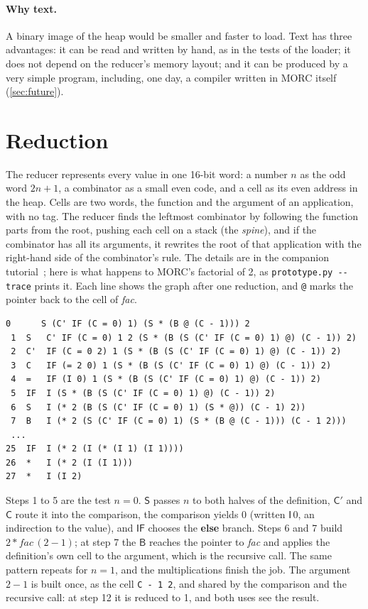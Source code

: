 \documentclass[11pt,a4paper]{article}
\newcommand{\cmb}[1]{\textsf{#1}}
\newcommand{\I}{\cmb{I}}
\newcommand{\Sc}{\cmb{S}}
\newcommand{\B}{\cmb{B}}
\newcommand{\C}{\cmb{C}}
\newcommand{\Cp}{\cmb{C}'}
\newcommand{\IF}{\cmb{IF}}
\theoremstyle{definition}
\theoremstyle{plain}
\newcommand{\kw}[1]{\textbf{#1}}
\begin{document}
\paragraph{Why text.} A binary image of the heap would be smaller and faster
to load. Text has three advantages: it can be read and written by hand, as
in the tests of the loader; it does not depend on the reducer's memory
layout; and it can be produced by a very simple program, including, one day,
a compiler written in MORC itself (\cref{sec:future}).

\section{Reduction}\label{sec:reduction}

The reducer represents every value in one 16-bit word: a number $n$ as the
odd word $2n+1$, a combinator as a small even code, and a cell as its even
address in the heap. Cells are two words, the function and the argument of an
application, with no tag. The reducer finds the leftmost combinator by
following the function parts from the root, pushing each cell on a stack (the
\emph{spine}), and if the combinator has all its arguments, it rewrites the
root of that application with the right-hand side of the combinator's rule.
The details are in the companion tutorial~\cite{graphtut}; here is what
happens to MORC's factorial of 2, as \texttt{prototype.py -{}-trace} prints
it. Each line shows the graph after one reduction, and \verb|@| marks the
pointer back to the cell of \textit{fac}.

\begin{lstlisting}[style=plain, basicstyle=\ttfamily\footnotesize]
 0      S (C' IF (C = 0) 1) (S * (B @ (C - 1))) 2
 1  S   C' IF (C = 0) 1 2 (S * (B (S (C' IF (C = 0) 1) @) (C - 1)) 2)
 2  C'  IF (C = 0 2) 1 (S * (B (S (C' IF (C = 0) 1) @) (C - 1)) 2)
 3  C   IF (= 2 0) 1 (S * (B (S (C' IF (C = 0) 1) @) (C - 1)) 2)
 4  =   IF (I 0) 1 (S * (B (S (C' IF (C = 0) 1) @) (C - 1)) 2)
 5  IF  I (S * (B (S (C' IF (C = 0) 1) @) (C - 1)) 2)
 6  S   I (* 2 (B (S (C' IF (C = 0) 1) (S * @)) (C - 1) 2))
 7  B   I (* 2 (S (C' IF (C = 0) 1) (S * (B @ (C - 1))) (C - 1 2)))
 ...
25  IF  I (* 2 (I (* (I 1) (I 1))))
26  *   I (* 2 (I (I 1)))
27  *   I (I 2)
\end{lstlisting}

\noindent
Steps 1 to 5 are the test $n = 0$. $\Sc$ passes $n$ to both halves of the
definition, $\Cp$ and $\C$ route it into the comparison, the comparison
yields 0 (written $\I\,0$, an indirection to the value), and $\IF$ chooses the
\kw{else} branch. Steps 6 and 7 build $2 * \mathit{fac}\,(2-1)$; at step 7 the
$\B$ reaches the pointer to \textit{fac} and applies the definition's own
cell to the argument, which is the recursive call. The same pattern repeats
for $n=1$, and the multiplications finish the job. The argument $2-1$ is
built once, as the cell \verb|C - 1 2|, and shared by the comparison and the
recursive call: at step 12 it is reduced to 1, and both uses see the result.
\end{document}

